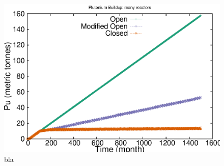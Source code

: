 \begin{figure}
\label{fig:puseries-n}
\caption{bla}
\begin{center}
\includegraphics{./images/puseries-n.eps}
\end{center}
\end{figure}

